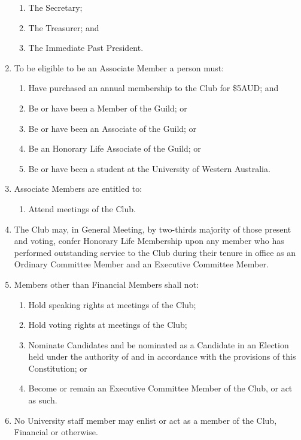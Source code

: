 \documentclass[12pt]{article}
\begin{document}
\begin{enumerate}[label=4.\arabic*]
\begin{enumerate}[label=\theenumi.\arabic*]
        \item The Secretary;
        \item The Treasurer; and
        \item The Immediate Past President.
    \end{enumerate}
    \item To be eligible to be an Associate Member a person must:
    \begin{enumerate}[label=\theenumi.\arabic*]
        \item Have purchased an annual membership to the Club for \$5AUD; and 
        \item Be or have been a Member of the Guild; or
        \item Be or have been an Associate of the Guild; or
        \item Be an Honorary Life Associate of the Guild; or
        \item Be or have been a student at the University of Western Australia.
    \end{enumerate}
    \item Associate Members are entitled to:
    \begin{enumerate}[label=\theenumi.\arabic*]
        \item Attend meetings of the Club.
    \end{enumerate}
    \item The Club may, in General Meeting, by two-thirds majority of those present and voting, confer Honorary Life Membership upon any member who has performed outstanding service to the Club during their tenure in office as an Ordinary Committee Member and an Executive Committee Member.
    \item Members other than Financial Members shall not:
    \begin{enumerate}[label=\theenumi.\arabic*]
        \item Hold speaking rights at meetings of the Club;
        \item Hold voting rights at meetings of the Club;
        \item Nominate Candidates and be nominated as a Candidate in an Election held under the authority of and in accordance with the provisions of this Constitution; or
        \item Become or remain an Executive Committee Member of the Club, or act as such.
    \end{enumerate}
    \item No University staff member may enlist or act as a member of the Club, Financial or otherwise.
\end{enumerate}
\end{document}
